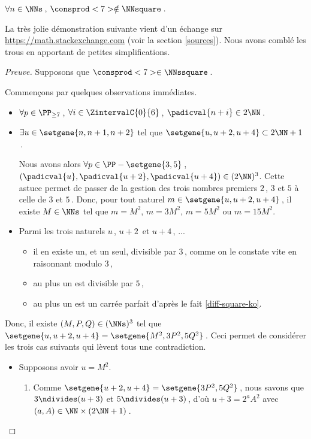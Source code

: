 \begin{fact} \label{case-7}
	 $\forall n \in \NNs$\,, $\consprod<7> \notin \NNsquare$\,.
\end{fact}




La très jolie démonstration suivante vient d'un échange sur \url{https://math.stackexchange.com} (voir la section \ref{sources}). Nous avons comblé les trous en apportant de petites simplifications.
	

\begin{proof}[Preuve]
	Supposons que $\consprod<7> \in \NNssquare$\,.
	
	\smallskip
	
	Commençons par quelques observations immédiates.
    \begin{itemize}
    	\item  
		$\forall p \in \PP_{\geq 7}$\,, 
   		$\forall i \in \ZintervalC{0}{6}$\,, 
    	$\padicval{n + i} \in 2 \NN$\,.
	
	
		\item $\exists u \in \setgene{n, n+1, n+2}$ tel que $\setgene{u, u + 2, u + 4} \subset 2 \NN + 1$\,.
		
		\noindent
		Nous avons alors
		$\forall p \in \PP - \setgene{3, 5}$\,, 
   		$(\padicval{u}, \padicval{u+2}, \padicval{u+4}) \in ( 2 \NN )^3$.
		Cette astuce permet de passer de la gestion des trois nombres premiers $2$\,, $3$ et $5$ à celle de $3$ et $5$\,.
		Donc, pour tout naturel $m \in \setgene{u, u + 2, u + 4}$\,, 
		il existe $M \in \NNs$ tel que 
		$m = M^2$, $m = 3 M^2$, $m = 5 M^2$ ou $m = 15 M^2$.
	
	
		\item Parmi les trois naturels $u$\,, $u + 2$\, et $u + 4$\,, ...
		\begin{itemize}
    		\item il en existe un, et un seul, divisible par $3$\,, comme on le constate vite en raisonnant modulo $3$\,,

    		\item au plus un est divisible par $5$\,,

    		\item au plus un est un carrée parfait d'après le fait \ref{diff-square-ko}.
		\end{itemize}
    \end{itemize}

    \smallskip
	
	Donc, il existe $(M, P, Q) \in ( \NNs )^3$ tel que 
    $\setgene{u, u + 2, u + 4} = \setgene{M^2, 3P^2, 5Q^2}$\,.
    Ceci permet de considérer les trois cas suivants qui lèvent tous une contradiction.
    \begin{itemize}
    	\item Supposons avoir $u = M^2$.
		\begin{enumerate}
			\item Comme $\setgene{u + 2, u + 4} = \setgene{3P^2, 5Q^2}$\,, nous savons que $3 \ndivides (u + 3)$ et $5 \ndivides (u + 3)$\,, d'où $u + 3 = 2^a A^2$ avec $(a, A) \in \NN \times (2\NN + 1)$\,.


\end{enumerate}
\end{itemize}
\end{proof}
